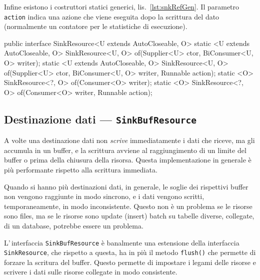 Infine esistono i costruttori statici generici, lis.~\ref{lst:snkRefGen}.
Il parametro \texttt{action} indica una azione che viene eseguita dopo la
scrittura del dato (normalmente un contatore per le statistiche di esecuzione).

\begin{elisting}[!htb]
\begin{javacode}
public interface SinkResource<U extends AutoCloseable, O> {
    static <U extends AutoCloseable, O> SinkResource<U, O> of(Supplier<U> ctor, BiConsumer<U, O> writer);
    static <U extends AutoCloseable, O> SinkResource<U, O> of(Supplier<U> ctor, BiConsumer<U, O> writer,
                                                              Runnable action);
    static <O> SinkResource<?, O> of(Consumer<O> writer);
    static <O> SinkResource<?, O> of(Consumer<O> writer, Runnable action);
}
\end{javacode}
\caption{Metodi per creare una risorsa \texttt{SinkResource} generica}
\label{lst:snkRefGen}
\end{elisting}

\subsection{Destinazione dati --- \texttt{SinkBufResource}} \label{sec:snkBufRes}
A volte una destinazione dati non \textit{scrive} immediatamente i dati che
riceve, ma gli accumula in un buffer, e la scrittura avviene al raggiungimento
di un limite del buffer o prima della chiusura della risorsa.
Questa implementazione in generale è più performante rispetto alla scrittura
immediata.

Quando si hanno più destinazioni dati, in generale, le soglie dei rispettivi
buffer non vengono raggiunte in modo sincrono, e i dati vengono scritti,
temporaneamente, in modo inconsistente.
Questo non è un problema se le risorse sono files, ma se le risorse sono update
(insert) batch su tabelle diverse, collegate, di un database, potrebbe essere
un problema.

L'\,interfaccia \texttt{SinkBufResource} è banalmente una estensione della
interfaccia \texttt{SinkResource}, che rispetto a questa, ha in più il metodo
\texttt{flush()} che permette di forzare la scritura del buffer.
Questo permette di impostare i legami delle risorse e scrivere i dati sulle
risorse collegate in modo consistente.

